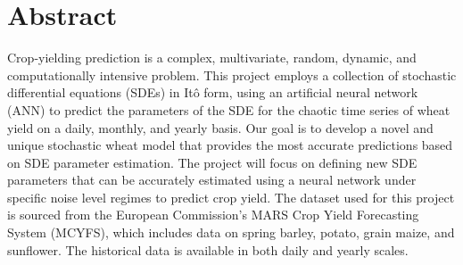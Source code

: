 \section*{Abstract}
Crop-yielding prediction is a complex, multivariate, random, dynamic, and computationally intensive problem. This project employs a collection of stochastic differential equations (SDEs) in Itô form, using an artificial neural network (ANN) to predict the parameters of the SDE for the chaotic time series of wheat yield on a daily, monthly, and yearly basis. Our goal is to develop a novel and unique stochastic wheat model that provides the most accurate predictions based on SDE parameter estimation. The project will focus on defining new SDE parameters that can be accurately estimated using a neural network under specific noise level regimes to predict crop yield. The dataset used for this project is sourced from the European Commission’s MARS Crop Yield Forecasting System (MCYFS), which includes data on spring barley, potato, grain maize, and sunflower. The historical data is available in both daily and yearly scales.
